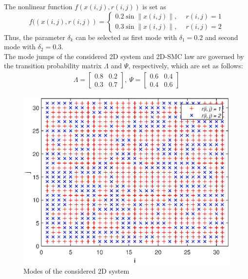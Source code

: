 \documentclass[conference]{IEEEtran}
\begin{document}
The nonlinear function $f(x(i,j),r(i,j))$ is set as
\begin{equation*}
	f((x(i,j),r(i,j)) = \begin{cases}
	0.2\sin{ \|x(i,j)\|}, \quad \ r(i,j)=1\\
	0.3\sin{ \|x(i,j)\|}, \quad \ r(i,j)=2
	\end{cases}
\end{equation*}
Thus, the parameter $\delta_{k}$ can be selected as first mode with $\delta_{1}=0.2$  and  second mode with $\delta_{2}=0.3$.\\
The mode jumps of the considered 2D system and 2D-SMC law are governed by the transition probability matrix  $\varLambda$ and $\varPsi$, respectively, which are set as follows:
\begin{equation*}
\begin{aligned}
	\varLambda=\begin{bmatrix}
	0.8&0.2\\ 0.3&0.7
	\end{bmatrix}, \ 
	\varPsi = \begin{bmatrix}
	0.6&0.4\\ 0.4 &0.6
	\end{bmatrix}
\end{aligned}
\end{equation*}
\begin{figure}[!htb]
	\centering\includegraphics[scale=0.6]{./simulations/r_eps.eps}
	\caption{Modes of the considered  2D system}
	\label{fig1}
\end{figure}
\end{document}
